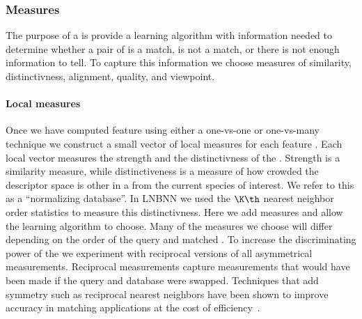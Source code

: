         \subsubsection{Measures}
            The purpose of a \matchvec{} is provide a learning algorithm with
              information needed to determine whether a pair of \annots{} is a
              match, is not a match, or there is not enough information to tell.
            To capture this information we choose measures of similarity,
              distinctivness, alignment, quality, and viewpoint.

            \paragraph{Local measures}
            Once we have computed feature \correspondences{} using either a
              one-vs-one or one-vs-many technique we construct a small vector of
              local measures for each feature \correspondence{}.
            Each local vector measures %
            the strength and the distinctivness of the \correspondence{}.
            Strength is a similarity measure, while distinctiveness is a
              measure of how crowded the descriptor space is \wrt{} other
              \annots{} in a from the current species of interest.
            We refer to this as a ``normalizing database''.
            In LNBNN we used the $\K\th$ nearest neighbor order statistics to
              measure this distinctivness.
            Here we add measures and allow the learning algorithm to choose.
            Many of the measures we choose will differ depending on the order
              of the query and matched \annot{}.
            To increase the discriminating power of the \matchvec{} we
              experiment with reciprocal versions of all asymmetrical
              measurements.
            Reciprocal measurements capture measurements that would have been
              made if the query and database \annots{} were swapped.
            Techniques that add symmetry such as reciprocal nearest neighbors
              have been shown to improve accuracy in matching applications at
              the cost of efficiency~\cite{qin_hello_2011}.

